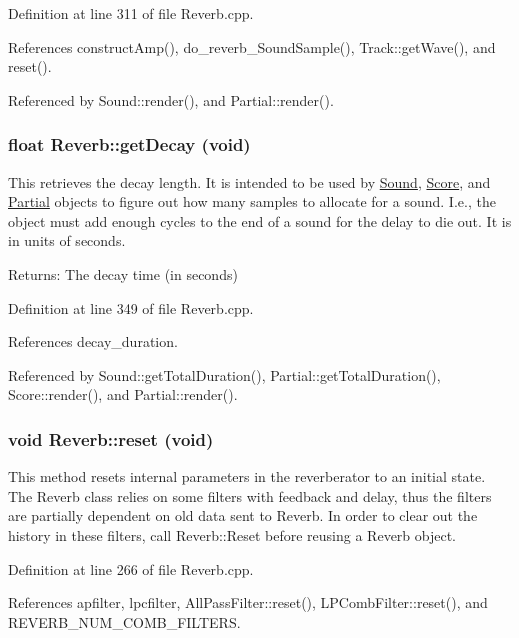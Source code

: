 Definition at line 311 of file Reverb.cpp.

References construct\-Amp(), do\_\-reverb\_\-Sound\-Sample(), Track::get\-Wave(), and reset().

Referenced by Sound::render(), and Partial::render().\hypertarget{classReverb_a11}{
\subsubsection[getDecay]{\setlength{\rightskip}{0pt plus 5cm}float Reverb::get\-Decay (void)}}
\label{classReverb_a11}


This retrieves the decay length. It is intended to be used by \hyperlink{classSound}{Sound}, \hyperlink{classScore}{Score}, and \hyperlink{classPartial}{Partial} objects to figure out how many samples to allocate for a sound. I.e., the object must add enough cycles to the end of a sound for the delay to die out. It is in units of seconds.

\begin{Desc}
\item[Returns:]The decay time (in seconds) \end{Desc}


Definition at line 349 of file Reverb.cpp.

References decay\_\-duration.

Referenced by Sound::get\-Total\-Duration(), Partial::get\-Total\-Duration(), Score::render(), and Partial::render().\hypertarget{classReverb_a7}{
\subsubsection[reset]{\setlength{\rightskip}{0pt plus 5cm}void Reverb::reset (void)}}
\label{classReverb_a7}


This method resets internal parameters in the reverberator to an initial state. The Reverb class relies on some filters with feedback and delay, thus the filters are partially dependent on old data sent to Reverb. In order to clear out the history in these filters, call Reverb::Reset before reusing a Reverb object. 

Definition at line 266 of file Reverb.cpp.

References apfilter, lpcfilter, All\-Pass\-Filter::reset(), LPComb\-Filter::reset(), and REVERB\_\-NUM\_\-COMB\_\-FILTERS.

